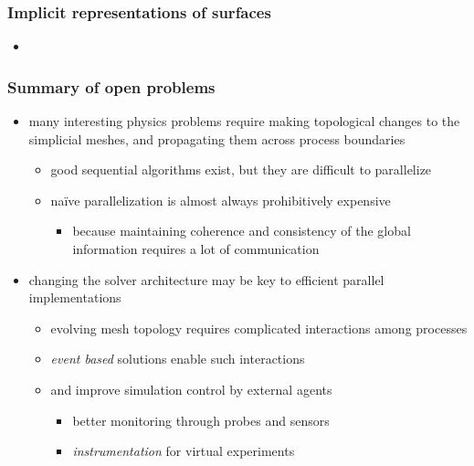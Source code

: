 \begin{frame}[fragile]
%
  \frametitle{Implicit representations of surfaces}
%
  \begin{itemize}
%
  \item 
%
  \end{itemize}
%
\end{frame}

\begin{frame}[fragile]
%
  \frametitle{Summary of open problems}
%
  \begin{itemize}
%
  \item many interesting physics problems require making topological changes to the simplicial
    meshes, and propagating them across process boundaries
    \begin{itemize}
    \item good sequential algorithms exist, but they are difficult to parallelize
    \item na\"ive parallelization is almost always prohibitively expensive
      \begin{itemize}
      \item because maintaining coherence and consistency of the global information requires a
        lot of communication
      \end{itemize}
    \end{itemize}
%
  \item changing the solver architecture may be key to efficient parallel implementations
    \begin{itemize}
      \item evolving mesh topology requires complicated interactions among processes
      \item {\em event based} solutions enable such interactions
      \item and improve simulation control by external agents
        \begin{itemize}
          \item better monitoring through probes and sensors
          \item {\em instrumentation} for virtual experiments
        \end{itemize}
    \end{itemize}
%
  \end{itemize}
%
\end{frame}

